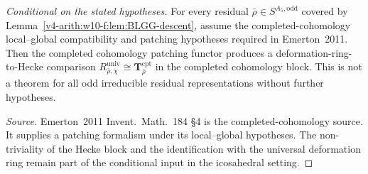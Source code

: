 \begin{lemma}
\label{v4-arith:w10-f:lem:Emerton-patching}
\emph{Conditional on the stated hypotheses.} For every residual
\(\bar\rho\in S^{A_{5},\mathrm{odd}}\) covered by
Lemma~\ref{v4-arith:w10-f:lem:BLGG-descent}, assume the completed-cohomology
local--global compatibility and patching hypotheses required in
Emerton~2011. Then the completed cohomology patching functor produces
a deformation-ring-to-Hecke comparison
\(R^{\mathrm{univ}}_{\bar\rho,\chi}\cong\mathbf{T}^{\mathrm{cpt}}_{\bar\rho}\)
in the completed cohomology block. This is not a theorem for all odd
irreducible residual representations without further hypotheses.
\end{lemma}

\begin{proof}[Source]
Emerton~2011 Invent.~Math.~184 \S 4 is the completed-cohomology source.
It supplies a patching formalism under its local--global hypotheses.
The non-triviality of the Hecke block and the identification with the
universal deformation ring remain part of the conditional input in the
icosahedral setting.
\end{proof}

